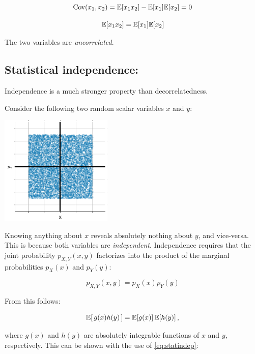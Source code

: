 \begin{equation}
\label{eq:uncorr}
\mathrm{Cov}(x_1, x_2) = \mathbb{E}  \lbrack x_1  x_2 \rbrack - \mathbb{E}  \lbrack x_1 \rbrack \mathbb{E} \lbrack x_2 \rbrack  = 0
\end{equation}

\begin{equation}
\mathbb{E}  \lbrack x_1  x_2 \rbrack = \mathbb{E}  \lbrack x_1 \rbrack \mathbb{E} \lbrack x_2 \rbrack
\end{equation}

The two variables are \emph{uncorrelated}.

\subsection{Statistical independence:}

Independence is a much stronger property than decorrelatedness. 

Consider the following two random scalar variables $x$ and $y$:
\begin{center}
\includegraphics[width=0.4\textwidth]{img/uniform_fixed.png}
\end{center}

Knowing anything about $x$ reveals absolutely nothing about $y$, and vice-versa. This is because both variables are \emph{independent}. 
Independence requires that the joint probability $p_{X,Y}(x,y)$ factorizes into the product of 
the marginal probabilities $p_X(x)$ and  $p_Y(y)$:

\begin{equation}
\label{eq:statindep}
p_{X,Y}(x,y) = p_X(x) p_Y(y)
\end{equation}

From this follows:

\begin{equation}
\label{eq:statindepexp}
\mathbb{E}  \lbrack \, g(x) h(y) \, \rbrack = \mathbb{E} \lbrack g(x) \rbrack \, \mathbb{E} \lbrack h(y) \rbrack  \,,
\end{equation}

where $g(x)$ and $h(y)$ are absolutely integrable functions of $x$ and $y$, respectively. 
This can be shown with the use of \eqref{eq:statindep}:

